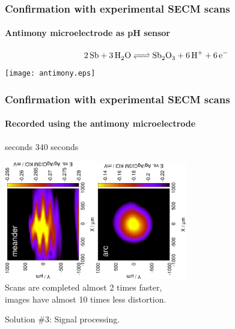 \documentclass{beamer}
\begin{document}
\begin{frame}
\frametitle{Confirmation with experimental SECM scans}
\framesubtitle{Antimony microelectrode as pH sensor}
\centering
\begin{equation*}
    \ce{2Sb + 3H_2O <=> Sb_2O_3 + 6H^+ + 6e^-}
\end{equation*}
\texttt{[image: antimony.eps]}

\end{frame} 


\begin{frame}
	\centering
	\frametitle{Confirmation with experimental SECM scans}
	\framesubtitle{Recorded using the antimony microelectrode}
	\quad\quad\quad\quad{} seconds \hfill 340 seconds \quad\quad\quad\quad\quad\quad


	\includegraphics[width=0.3\textwidth, angle=-90]{meander.eps}\includegraphics[width=0.3\textwidth, angle=-90]{arc.eps}\\
	\vfill
	Scans are completed almost 2 times faster,\\ images have almost 10 times less distortion.
\end{frame}

\begin{frame}[plain]
\centering
Solution \#3: Signal processing.
\end{frame}
\end{document}
